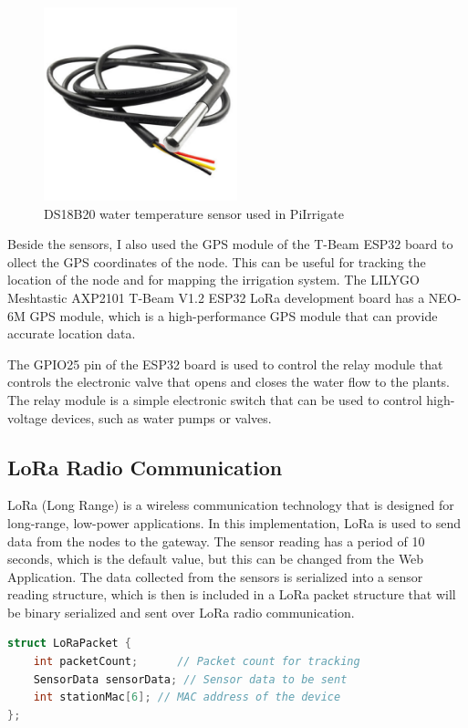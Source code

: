 \begin{figure}[H]
    \centering
    \includegraphics[width=0.5\textwidth]{images/water-temp.png}
    \caption{DS18B20 water temperature sensor used in PiIrrigate}
    \label{fig:ds18b20}
\end{figure}

Beside the sensors, I also used the GPS module of the T-Beam ESP32 board to 
ollect the GPS coordinates of the node. 
This can be useful for tracking the location of the node and for mapping the irrigation system.
The LILYGO Meshtastic AXP2101 T-Beam V1.2 ESP32 LoRa development board has a
NEO-6M GPS module, which is a high-performance GPS module that can provide accurate location data.

The GPIO25 pin of the ESP32 board is used to control the relay module that controls 
the electronic valve that opens and closes the water flow to the plants.
The relay module is a simple electronic switch that 
can be used to control high-voltage devices, such as water pumps or valves.

\subsection{LoRa Radio Communication}
LoRa (Long Range) is a wireless communication technology 
that is designed for long-range, low-power applications.
In this implementation, LoRa is used to send data from the nodes to the gateway.
The sensor reading has a period of 10 seconds, which is the default value, but this can be changed from the Web Application.
The data collected from the sensors is serialized into a sensor reading structure, 
which is then is included in a LoRa packet structure that will be 
binary serialized and sent over LoRa radio communication.

\begin{lstlisting}[language=C, caption={LoRa packet structure}]
struct LoRaPacket {
    int packetCount;      // Packet count for tracking
    SensorData sensorData; // Sensor data to be sent
    int stationMac[6]; // MAC address of the device
};
\end{lstlisting}

